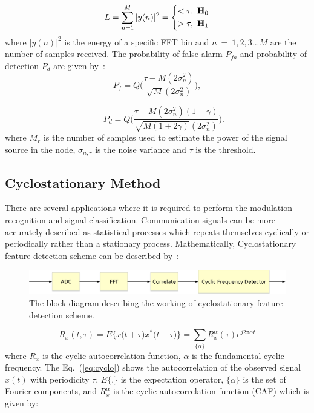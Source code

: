 \begin{equation}
\label{eq:2}
	L = \sum_{n=1}^{M}{|y(n)|^2} = 
	\left\{
	\begin{aligned}
		<\tau,~\mathbf{H}_0 \\
		>\tau,~\mathbf{H}_1		
	\end{aligned}
	\right.
\end{equation}
where $|y(n)|^2$ is the energy of a specific FFT bin and $n~=~1,2,3...M$ are the number of samples received. The probability of false alarm $P_{fa}$ and probability of detection $P_d$ are given by~\cite{arhtn4}:
\begin{equation}
\label{eq:3}
P_f = Q\Bigg(\dfrac{\tau-M(2\sigma_n^2)}{\sqrt{M}(2\sigma_n^2)}\Bigg),
\end{equation}

\begin{equation}
\label{eq:4}
~~~~~~~P_d = Q\Bigg(\dfrac{\tau-M(2\sigma_n^2)(1+\gamma)}{\sqrt{M(1+2\gamma)}(2\sigma_n^2)}\Bigg).
\end{equation}
where $M_r$ is the number of samples used to estimate the power of the signal source in the node, $\sigma_{n,r}$ is the noise variance and $\tau$ is the threshold.

\subsection{Cyclostationary Method}

There are several applications where it is required to perform the modulation recognition and signal classification. Communication signals can be more accurately described as statistical processes which repeats themselves cyclically or periodically rather than a stationary process. Mathematically, Cyclostationary feature detection scheme can be described by~\cite{bookhtn1}:

\begin{figure}[ht!]
	\centering
	\includegraphics[width=\textwidth,keepaspectratio]{images/Gill/figs/cyclostationary.eps}
    \caption{The block diagram describing the working of cyclostationary feature detection scheme.} 
\label{cycl}      
\end{figure}

\begin{equation}
\label{eq:cyclo}
R_x(t,\tau) = E\Bigg\{x\bigg(t+\tau \bigg)x^*\bigg(t-\tau \bigg)\Bigg\} = \sum_{\{\alpha\}} R_x^{\alpha}(\tau)e^{j2\pi\alpha t}
\end{equation}
where $R_x$ is the cyclic autocorrelation function, $\alpha$ is the fundamental cyclic frequency.
The Eq.~(\ref{eq:cyclo}) shows the autocorrelation of the observed signal $x(t)$ with periodicity $\tau$, $E\{.\}$ is the expectation operator, $\{\alpha\}$ is the set of Fourier components, and $R_x^{\alpha}$ is the cyclic autocorrelation function (CAF) which is given by:

